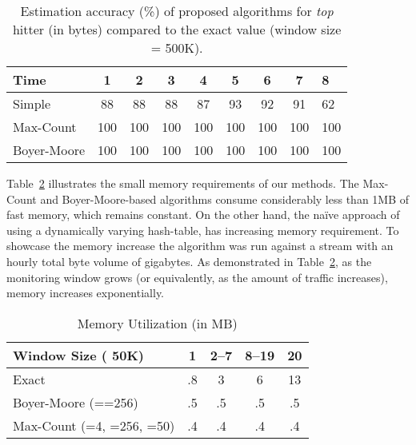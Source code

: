 \documentclass[10pt, conference, letterpaper,onecolumn]{IEEEtranv1.8}
\theoremstyle{plain}\newtheorem{thm}{Theorem}\newtheorem{lem}{Lemma}
\theoremstyle{definition}
\begin{document}
\begin{table}[t]
        \caption{\footnotesize Estimation accuracy (\%) of proposed algorithms
        for \emph{top} hitter  (in bytes) compared to the exact value (window size = 500K).}
        \label{tab:est:accuracy:value}
  \centering      
 \scriptsize       
\begin{tabular}{|l|cccccccl|}
\hline
{\bf Time} & {\bf 1}     & {\bf 2}     & {\bf 3}     & {\bf 4}     & {\bf 5}     & {\bf 6}     & {\bf 7}     & {\bf 8}       \\
\hline
\hline
Simple                        & 88  & 88  & 88  & 87  & 93  & 92  & 91  & 62 \\
Max-Count                     & 100 & 100 & 100 & 100 & 100 & 100 & 100 & 100  \\
Boyer-Moore                   & 100 & 100 & 100 & 100 & 100 & 100 & 100 & 100  \\
\hline
\end{tabular}
\end{table}



Table~\ref{tab:mem} illustrates the small memory requirements of our methods. The Max-Count and
Boyer-Moore-based algorithms consume considerably less than 1MB of fast memory, which remains constant. On the other hand, the na\"ive approach
of using a dynamically varying hash-table, has increasing memory requirement. 
To showcase the memory increase the algorithm was run against a stream with an hourly total byte volume of  gigabytes.
As demonstrated
in Table~\ref{tab:mem}, as the monitoring window grows (or equivalently, as the amount of traffic increases),
memory increases exponentially.



\begin{table}[t]
\caption{\footnotesize Memory Utilization (in MB)}
\label{tab:mem}
\centering
\begin{tabular}{|l| c c c c |}
\hline
{\bf Window Size ( 50K)}  & {\bf 1}    & {\bf 2--7}  & {\bf 8--19} & {\bf 20}     \\
\hline
\hline
Exact                                                 & .8 & 3  & 6  & 13  \\
Boyer-Moore (==256)                                                & .5 & .5 & .5 & .5   \\
Max-Count     (=4, =256, =50)                                       & .4 & .4 & .4 & .4  \\
\hline                                                      
\end{tabular}
\end{table}
\end{document}
